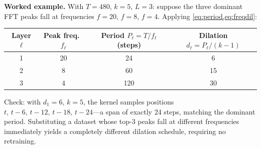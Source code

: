 \documentclass[12pt,a4paper]{article}
\begin{document}
\noindent\textbf{Worked example.}\quad
With $T{=}480$, $k{=}5$, $L{=}3$: suppose the three dominant FFT peaks fall
at frequencies $f{=}20$, $f{=}8$, $f{=}4$. Applying \cref{eq:period,eq:freqdil}:

\smallskip
\begin{center}
  \small
  \setlength{\tabcolsep}{10pt}
  \renewcommand{\arraystretch}{1.2}
  \begin{tabular}{@{}cccc@{}}
    \toprule
    Layer $\ell$ & Peak freq.\ $f_\ell$ & Period $P_\ell = T/f_\ell$ (steps)
                 & Dilation $d_\ell = P_\ell/(k{-}1)$ \\
    \midrule
    1 & 20 & 24  & 6  \\
    2 &  8 & 60  & 15 \\
    3 &  4 & 120 & 30 \\
    \bottomrule
  \end{tabular}
\end{center}
\smallskip

\noindent
Check: with $d_1{=}6$, $k{=}5$, the kernel samples positions
$t,\,t{-}6,\,t{-}12,\,t{-}18,\,t{-}24$---a span of exactly 24 steps,
matching the dominant period. Substituting a dataset whose top-3 peaks
fall at different frequencies immediately yields a completely different
dilation schedule, requiring no retraining.
\end{document}
